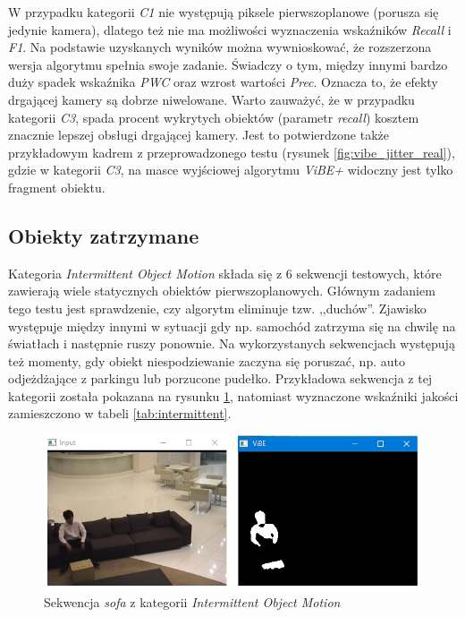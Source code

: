 W przypadku kategorii \textit{C1} nie występują piksele pierwszoplanowe (porusza się jedynie kamera), dlatego też nie ma możliwości wyznaczenia wskaźników \textit{Recall} i \textit{F1}. Na podstawie uzyskanych wyników można wywnioskować, że rozszerzona wersja algorytmu spełnia swoje zadanie. Świadczy o tym, między innymi bardzo duży spadek wskaźnika \textit{PWC} oraz wzrost wartości \textit{Prec}. Oznacza to, że efekty drgającej kamery są dobrze niwelowane. Warto zauważyć, że w przypadku kategorii \textit{C3}, spada procent wykrytych obiektów (parametr \textit{recall}) kosztem znacznie lepszej obsługi drgającej kamery. Jest to potwierdzone także przykładowym kadrem z przeprowadzonego testu (rysunek \ref{fig:vibe_jitter_real}), gdzie w kategorii \textit{C3}, na masce wyjściowej algorytmu \textit{ViBE+} widoczny jest tylko fragment obiektu.

\subsection{Obiekty zatrzymane}
\label{subsec:obiekty_zatrzymane}

Kategoria \textit{Intermittent Object Motion} składa się z 6 sekwencji testowych, które zawierają wiele statycznych obiektów pierwszoplanowych. Głównym zadaniem tego testu jest sprawdzenie, czy algorytm eliminuje tzw. ,,duchów''. 
Zjawisko występuje między innymi w sytuacji gdy np. samochód zatrzyma się na chwilę na światłach i następnie ruszy ponownie. Na wykorzystanych sekwencjach występują też momenty, gdy obiekt niespodziewanie zaczyna się poruszać, np. auto odjeżdżające z parkingu lub porzucone pudełko. Przykładowa sekwencja z tej kategorii została pokazana na rysunku \ref{fig:stopped_example}, natomiast wyznaczone wskaźniki jakości zamieszczono w tabeli \ref{tab:intermittent}.

    \begin{figure}[h]
			\centering
			\includegraphics[scale=0.85]{img/5/stopped_example.png}
			\caption{Sekwencja \textit{sofa} z kategorii \textit{Intermittent Object Motion}}
			\label{fig:stopped_example}
	\end{figure}

